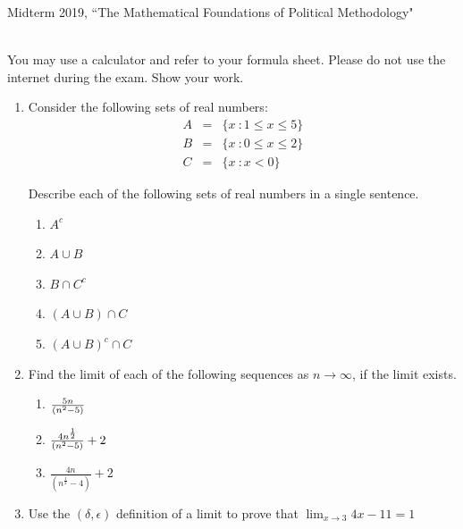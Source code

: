 \documentclass[11pt]{article}
\begin{document}
\noindent \large Midterm 2019, ``The Mathematical Foundations of Political Methodology"

\normalsize
\ \\You may use a calculator and refer to your formula sheet. Please do not use the internet during the exam.  Show your work.

\begin{enumerate}

\item Consider the following sets of real numbers:
\begin{eqnarray}
A&=& \{x\ : 1\leq x\leq 5\} \nonumber\\
B&=& \{x\ : 0\leq x\leq 2\}\nonumber\\
C&=& \{x\ : x<0\}\nonumber
\end{eqnarray}

Describe each of the following sets of real numbers in a single sentence.
\begin{enumerate}
\item $A^c$
\bigskip\bigskip

\item $A\cup B$
\bigskip\bigskip
\item $B\cap C^c$
\bigskip\bigskip
\item $(A\cup B)\cap C$
\bigskip\bigskip

\item $(A\cup B)^c\cap C$

\end{enumerate}

\vspace{.2in}

\item Find the limit of each of the following sequences as $n\rightarrow \infty$, if the limit exists.
\begin{enumerate}
\item ${{5n}\over{(n^2-5)}}$
\bigskip
\bigskip
\item ${{4n^{\frac{1}{2}}}\over{(n^2-5)}}+2$
\bigskip
\bigskip
\item  $\frac{4n}{(n^{\frac{1}{2}}-4)}+2$

\end{enumerate}

\pagebreak
\vspace{.2in}
\item Use the $(\delta, \epsilon)$ definition of a limit to prove that $\lim_{x\rightarrow 3} 4x-11=1$
%


\end{enumerate}
\end{document}
